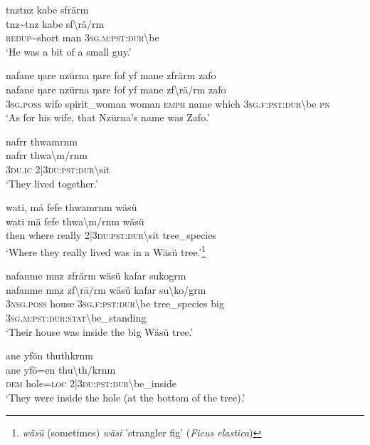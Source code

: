 \ea\label{ex:7:a4674}
tnztnz kabe sfrärm\\
\gll tnz{\textasciitilde}tnz	kabe	sf{\textbackslash}rä/rm\\
     \textsc{redup}{\textasciitilde}short	man	3\textsc{sg}.\textsc{m}:\textsc{pst}:\textsc{dur}{\textbackslash}be\\
\glt `He was a bit of a small guy.'
\z

\ea\label{ex:7:a4675}
nafane ŋare nzürna ŋare fof yf mane zfrärm zafo\\
\gll nafane	ŋare	nzürna	ŋare	fof	yf	mane	zf{\textbackslash}rä/rm	zafo\\
     3\textsc{sg}.\textsc{poss}	wife	spirit\_woman	woman	\textsc{emph}	name	which	3\textsc{sg}.\textsc{f}:\textsc{pst}:\textsc{dur}{\textbackslash}be	\textsc{pn}\\
\glt `As for his wife, that Nzürna's name was Zafo.'
\z

\ea\label{ex:7:a4678}
nafrr thwamrnm\\
\gll nafrr	thwa{\textbackslash}m/rnm\\
     3\textsc{du}.\textsc{ic}	2|3\textsc{du}:\textsc{pst}:\textsc{dur}{\textbackslash}sit\\
\glt `They lived together.'
\z

\ea\label{ex:7:a4679}
wati, mä fefe thwamrnm wäsü\\
\gll wati	mä	fefe	thwa{\textbackslash}m/rnm	wäsü\\
     then	where	really	2|3\textsc{du}:\textsc{pst}:\textsc{dur}{\textbackslash}sit	tree\_species\\
\glt `Where they really lived was in a Wäsü tree.'\footnote{\textit{wäsü} (sometimes) \textit{wäsi} 'strangler fig' (\textit{Ficus elastica})}
\z

\ea\label{ex:7:a4680}
nafanme mnz zfrärm wäsü kafar sukogrm\\
\gll nafanme	mnz	zf{\textbackslash}rä/rm	wäsü	kafar	su{\textbackslash}ko/grm\\
     3\textsc{nsg}.\textsc{poss}	house	3\textsc{sg}.\textsc{f}:\textsc{pst}:\textsc{dur}{\textbackslash}be	tree\_species	big	3\textsc{sg}.\textsc{m}:\textsc{pst}:\textsc{dur}:\textsc{stat}{\textbackslash}be\_standing\\
\glt `Their house was inside the big Wäsü tree.'
\z

\ea\label{ex:7:a4681}
ane yfön thuthkrnm\\
\gll ane	yfö=en	thu{\textbackslash}th/krnm\\
     \textsc{dem}	hole=\textsc{loc}	2|3\textsc{du}:\textsc{pst}:\textsc{dur}{\textbackslash}be\_inside\\
\glt `They were inside the hole (at the bottom of the tree).'
\z

